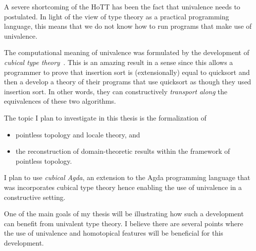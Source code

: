 \documentclass{article}
\begin{document}
A severe shortcoming of the HoTT has been the fact that univalence needs to postulated. In
light of the view of type theory as a practical programming language, this means that we
do not know how to run programs that make use of univalence.

The computational meaning of univalence was formulated by the development of \emph{cubical
type theory}~\cite{cubicaltt}. This is an amazing result in a sense since this allows a
programmer to prove that insertion sort is (extensionally) equal to quicksort and then a
develop a theory of their programs that use quicksort as though they used insertion sort.
In other words, they can constructively \emph{transport along} the equivalences of these
two algorithms.

The topic I plan to investigate in this thesis is the formalization of

\begin{itemize}
  \item pointless topology and locale theory, and
  \item the reconstruction of domain-theoretic results within the framework of pointless
    topology.
\end{itemize}

I plan to use \emph{cubical Agda}, an extension to the Agda programming language that was
incorporates cubical type theory hence enabling the use of univalence in a constructive
setting.

One of the main goals of my thesis will be illustrating how such a development can benefit
from univalent type theory. I believe there are several points where the use of univalence
and homotopical features will be beneficial for this development.



\end{document}
